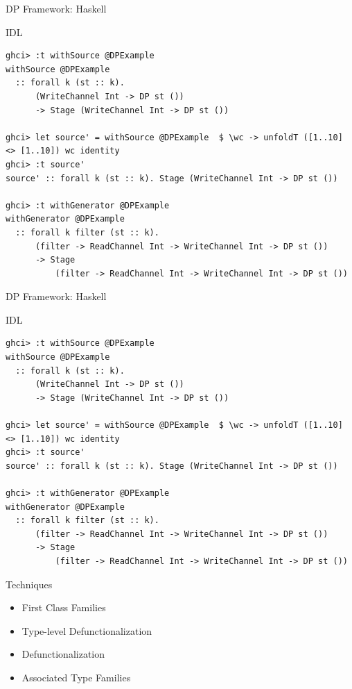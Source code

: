 \documentclass{beamer}
\begin{document}
  \begin{frame}[fragile]{DP Framework: Haskell}
    \begin{block}{IDL}
      \begin{verbatim}      
ghci> :t withSource @DPExample
withSource @DPExample
  :: forall k (st :: k).
      (WriteChannel Int -> DP st ())
      -> Stage (WriteChannel Int -> DP st ())
      
ghci> let source' = withSource @DPExample  $ \wc -> unfoldT ([1..10] <> [1..10]) wc identity
ghci> :t source'
source' :: forall k (st :: k). Stage (WriteChannel Int -> DP st ())

ghci> :t withGenerator @DPExample
withGenerator @DPExample
  :: forall k filter (st :: k).
      (filter -> ReadChannel Int -> WriteChannel Int -> DP st ())
      -> Stage
          (filter -> ReadChannel Int -> WriteChannel Int -> DP st ())    
    \end{verbatim}
  \end{block}
  \end{frame}

  \begin{frame}[fragile]{DP Framework: Haskell}
    \begin{block}{IDL}
      \begin{verbatim}      
ghci> :t withSource @DPExample
withSource @DPExample
  :: forall k (st :: k).
      (WriteChannel Int -> DP st ())
      -> Stage (WriteChannel Int -> DP st ())
      
ghci> let source' = withSource @DPExample  $ \wc -> unfoldT ([1..10] <> [1..10]) wc identity
ghci> :t source'
source' :: forall k (st :: k). Stage (WriteChannel Int -> DP st ())

ghci> :t withGenerator @DPExample
withGenerator @DPExample
  :: forall k filter (st :: k).
      (filter -> ReadChannel Int -> WriteChannel Int -> DP st ())
      -> Stage
          (filter -> ReadChannel Int -> WriteChannel Int -> DP st ())    
    \end{verbatim}
  \end{block}
  \begin{block}{Techniques}
    \begin{itemize}
      \item First Class Families
      \item Type-level Defunctionalization 
      \item Defunctionalization
      \item Associated Type Families
    \end{itemize}
  \end{block}
  \end{frame}
\end{document}
